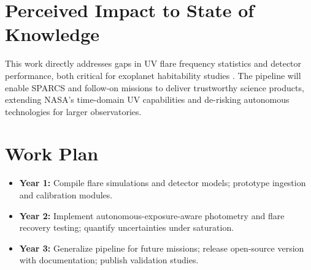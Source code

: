\documentclass[final,letterpaper,oneside,12pt]{article}
\begin{document}
\section{Perceived Impact to State of Knowledge}
This work directly addresses gaps in UV flare frequency statistics and detector performance, both critical for exoplanet habitability studies \citep{Segura2010,Luger2015}. The pipeline will enable SPARCS and follow-on missions to deliver trustworthy science products, extending NASA’s time-domain UV capabilities and de-risking autonomous technologies for larger observatories.

\section{Work Plan}
\begin{itemize}
    \item \textbf{Year 1:} Compile flare simulations and detector models; prototype ingestion and calibration modules.
    \item \textbf{Year 2:} Implement autonomous-exposure-aware photometry and flare recovery testing; quantify uncertainties under saturation.
    \item \textbf{Year 3:} Generalize pipeline for future missions; release open-source version with documentation; publish validation studies.
\end{itemize}

\newpage
\singlespacing
\setlength{\bibsep}{0ex}


\end{document}
